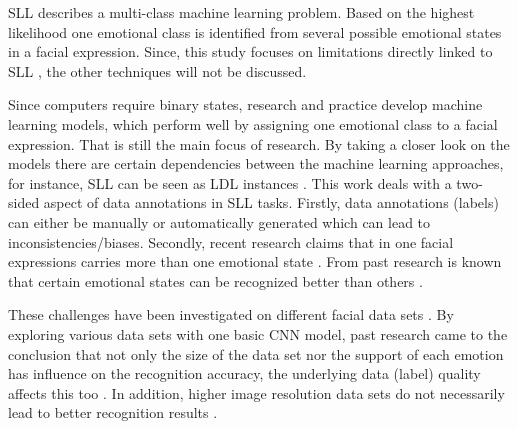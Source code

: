 \documentclass[a4paper, conference]{IEEEtran}
\begin{document}

SLL describes a multi-class machine learning problem. Based on the highest likelihood one emotional class is identified from several possible emotional states in a facial expression. Since, this study focuses on limitations directly linked to SLL \cite{ekundayoFacialExpressionRecognition2021}, the other techniques will not be discussed.
%

Since computers require binary states, research and practice develop machine learning models, which perform well by assigning one emotional class to a facial expression. That is still the main focus of research. By taking a closer look on the models there are certain dependencies between the machine learning approaches, for instance, SLL can be seen as LDL instances \cite{ekundayoFacialExpressionRecognition2021}. This work deals with a two-sided aspect of data annotations in SLL tasks. Firstly, data annotations (labels) can either be manually or automatically generated which can lead to inconsistencies/biases. Secondly, recent research claims that in one facial expressions carries more than one emotional state \cite{ekundayoFacialExpressionRecognition2021}. From past research is known that certain emotional states can be recognized better than others \cite{khaireddinFacialEmotionRecognition2021,quinnRealtimeEmotionRecognition2017}.

These challenges have been investigated on different facial data sets \cite{gebeleFaceValueImpact2022}. By exploring various data sets with one basic CNN model, past research came to the conclusion that not only the size of the data set nor the support of each emotion has influence on the recognition accuracy, the underlying data (label) quality affects this too \cite{gebeleFaceValueImpact2022}. In addition, higher image resolution data sets do not necessarily lead to better recognition results \cite{gebeleFaceValueImpact2022}.
\end{document}
